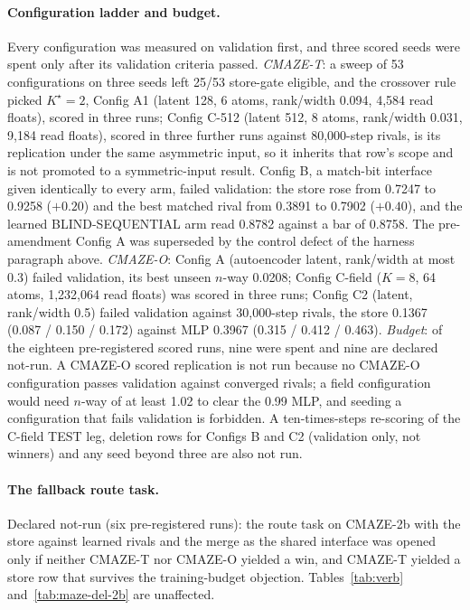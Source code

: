 \documentclass{article} %
\newcommand{\Kstar}{\ensuremath{K^{\star}}}
\begin{document}
\paragraph{Configuration ladder and budget.} Every configuration was measured on validation first,
and three scored seeds were spent only after its validation criteria passed. \emph{CMAZE-T}: a sweep of
53 configurations on three seeds left 25/53 store-gate eligible, and the crossover rule picked
$\Kstar=2$, Config A1 (latent 128, 6 atoms, rank/width 0.094, 4,584 read floats), scored in three
runs; Config C-512 (latent 512, 8 atoms, rank/width 0.031, 9,184 read floats), scored in three further
runs against 80,000-step rivals, is its replication under the same asymmetric input, so it inherits that row's scope and is not
promoted to a symmetric-input result. Config B, a match-bit interface given identically to
every arm, failed validation: the store rose from 0.7247 to 0.9258 ($+0.20$) and the best matched
rival from 0.3891 to 0.7902 ($+0.40$), and the learned BLIND-SEQUENTIAL arm read 0.8782 against a bar
of 0.8758. The pre-amendment Config A was superseded by the control defect of the harness paragraph
above. \emph{CMAZE-O}: Config A (autoencoder latent, rank/width at most 0.3) failed validation, its
best unseen $n$-way 0.0208; Config C-field ($K=8$, 64 atoms, 1,232,064 read floats) was scored in
three runs; Config C2 (latent, rank/width 0.5) failed validation against 30,000-step rivals, the store
0.1367 (0.087 / 0.150 / 0.172) against MLP 0.3967 (0.315 / 0.412 / 0.463). \emph{Budget}: of the eighteen
pre-registered scored runs, nine were spent and nine are declared not-run. A CMAZE-O scored
replication is not run because no CMAZE-O
configuration passes validation against converged rivals; a field configuration would need $n$-way
of at least 1.02 to clear the 0.99 MLP, and seeding a configuration that fails validation is
forbidden. A ten-times-steps re-scoring of the C-field TEST leg, deletion rows for Configs B and C2
(validation only, not winners) and any seed beyond three are also not run.
\paragraph{The fallback route task.} Declared not-run (six pre-registered runs): the route task on CMAZE-2b %
with the store against learned rivals and the merge as the shared interface was opened only if
neither CMAZE-T nor CMAZE-O yielded a win, and CMAZE-T yielded a store row that survives the
training-budget objection. Tables~\ref{tab:verb} and~\ref{tab:maze-del-2b} are unaffected.
\end{document}
